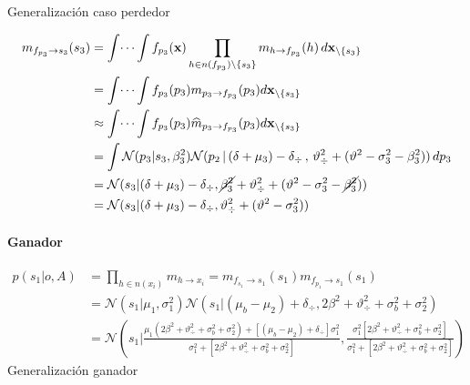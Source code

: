 \documentclass[11pt,twoside,spanish]{report} %
\begin{document}
Generalizaci\'on caso perdedor

\begin{equation}
	\begin{split}
		m_{f_{p_3} \rightarrow s_3}(s_3) & = \int \dots \int f_{p_3}(\textbf{x}) \prod_{h \in n(f_{p_3}) \backslash \{s_3\} } m_{h \rightarrow f_{p_3}}(h) \, d\textbf{x}_{\backslash \{s_3\} }  \\
		&= \int \dots \int f_{p_3}(p_3)m_{p_3 \rightarrow f_{p_3}}(p_3) d\textbf{x}_{\backslash \{s_3\} }  \\
		&\approx \int \dots \int f_{p_3}(p_3)\widehat{m}_{p_3 \rightarrow f_{p_3}}(p_3) d\textbf{x}_{\backslash \{s_3\} }  \\
		&= \int  \mathcal{N}(p_3| s_3, \beta_3^2)   \mathcal{N}( p_2 \,|\, (\delta + \mu_3) - \delta_{\div}  \,,\,\vartheta_{\div}^2 + (\vartheta^2 - \sigma_3^2 - \beta_3^2)) \, dp_3\\
		&=  \mathcal{N}( s_3|   (\delta + \mu_3) - \delta_{\div} , \cancel{\beta_3^2}+\vartheta_{\div}^2 + (\vartheta^2 - \sigma_3^2 - \cancel{\beta_3^2})) \\
		&=  \mathcal{N}( s_3|   (\delta + \mu_3) - \delta_{\div} , \vartheta_{\div}^2 + (\vartheta^2 - \sigma_3^2 ))
	\end{split}
\end{equation}

\paragraph{Ganador}
\begin{equation}
	\begin{split}
		p(s_1|o,A) &= \prod_{h \in n(x_i)} m_{h \rightarrow x_i} = m_{f_{s_1} \rightarrow s_1}(s_1) m_{f_{p_1} \rightarrow s_1}(s_1) \\
		&=  \mathcal{N}(s_1| \mu_1, \sigma_1^2)  \mathcal{N}( s_1|(\mu_b - \mu_2) + \delta_{\div} , 2\beta^2+\vartheta_{\div}^2 + \sigma_b^2 + \sigma_2^2) \\
		&=  \mathcal{N}\left(s_1|\frac{\mu_1(2\beta^2+\vartheta_{\div}^2 + \sigma_b^2 + \sigma_2^2)+ [(\mu_b - \mu_2) + \delta_{\div}]\sigma_1^2}{\sigma_1^2+[2\beta^2+\vartheta_{\div}^2 + \sigma_b^2 + \sigma_2^2]}, \frac{\sigma_1^2[2\beta^2+\vartheta_{\div}^2 + \sigma_b^2 + \sigma_2^2]}{\sigma_1^2+[2\beta^2+\vartheta_{\div}^2 + \sigma_b^2 + \sigma_2^2]}\right)
	\end{split}
\end{equation}
Generalizaci\'on ganador
\end{document}
